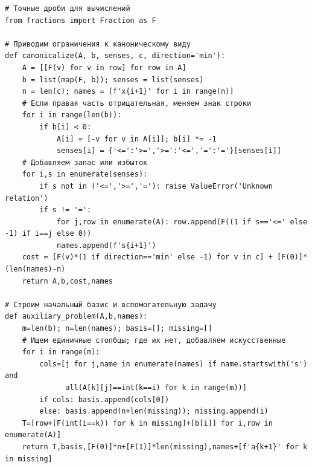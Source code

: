 \documentclass[12pt,a4paper]{article}
\begin{document}
\begin{Verbatim}[fontsize=\scriptsize,breaklines=true,breakanywhere=true]
# Точные дроби для вычислений
from fractions import Fraction as F

# Приводим ограничения к каноническому виду
def canonicalize(A, b, senses, c, direction='min'):
    A = [[F(v) for v in row] for row in A]
    b = list(map(F, b)); senses = list(senses)
    n = len(c); names = [f'x{i+1}' for i in range(n)]
    # Если правая часть отрицательная, меняем знак строки
    for i in range(len(b)):
        if b[i] < 0:
            A[i] = [-v for v in A[i]]; b[i] *= -1
            senses[i] = {'<=':'>=','>=':'<=','=':'='}[senses[i]]
    # Добавляем запас или избыток
    for i,s in enumerate(senses):
        if s not in ('<=','>=','='): raise ValueError('Unknown relation')
        if s != '=':
            for j,row in enumerate(A): row.append(F((1 if s=='<=' else -1) if i==j else 0))
            names.append(f's{i+1}')
    cost = [F(v)*(1 if direction=='min' else -1) for v in c] + [F(0)]*(len(names)-n)
    return A,b,cost,names

# Строим начальный базис и вспомогательную задачу
def auxiliary_problem(A,b,names):
    m=len(b); n=len(names); basis=[]; missing=[]
    # Ищем единичные столбцы; где их нет, добавляем искусственные
    for i in range(m):
        cols=[j for j,name in enumerate(names) if name.startswith('s') and
              all(A[k][j]==int(k==i) for k in range(m))]
        if cols: basis.append(cols[0])
        else: basis.append(n+len(missing)); missing.append(i)
    T=[row+[F(int(i==k)) for k in missing]+[b[i]] for i,row in enumerate(A)]
    return T,basis,[F(0)]*n+[F(1)]*len(missing),names+[f'a{k+1}' for k in missing]
\end{Verbatim}
\end{document}
